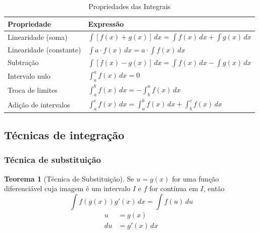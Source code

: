 \documentclass[12pt,openright,twoside,a4paper]{article}
\theoremstyle{definition}
\newtheorem{theorem}{Teorema}[section]
\begin{document}
		\begin{table}[h!]
			\centering
			\caption{Propriedades das Integrais}
			\begin{tabular}{|>{\centering\arraybackslash}m{6cm}|>{\centering\arraybackslash}m{8cm}|}
				\hline
				\textbf{Propriedade} & \textbf{Expressão} \\
				\hline
				Linearidade (soma) & $\displaystyle \int [f(x) + g(x)] \, dx = \int f(x) \, dx + \int g(x) \, dx$ \\
				\hline
				Linearidade (constante) & $\displaystyle \int a \cdot f(x) \, dx = a \cdot \int f(x) \, dx$ \\
				\hline
				Subtração & $\displaystyle \int [f(x) - g(x)] \, dx = \int f(x) \, dx - \int g(x) \, dx$ \\
				\hline
				Intervalo nulo & $\displaystyle \int_a^a f(x) \, dx = 0$ \\
				\hline
				Troca de limites & $\displaystyle \int_a^b f(x) \, dx = - \int_b^a f(x) \, dx$ \\
				\hline
				Adição de intervalos & $\displaystyle \int_a^c f(x) \, dx = \int_a^b f(x) \, dx + \int_b^c f(x) \, dx$ \\
				\hline
			\end{tabular}
			\label{tab:propriedades_integral}
		\end{table}
		\renewcommand{\arraystretch}{1.0}
	
	\subsection{Técnicas de integração}
	
	\subsubsection{Técnica de substituição}
		
		\begin{theorem}[Técnica de Substituição]
			Se $u = g(x)$ for uma função diferenciável cuja imagem é um intervalo $I$ e $f$ for contínua em $I$, então
			\begin{equation}
			\boxed{\int f(g(x)) g'(x) \, dx = \int f(u) \, du}
			\end{equation}
			\begin{align*}
				\quad u&=g(x) \quad\\
				\quad du&=g'(x) \, dx \quad
			\end{align*}
		\end{theorem}
		
\end{document}

